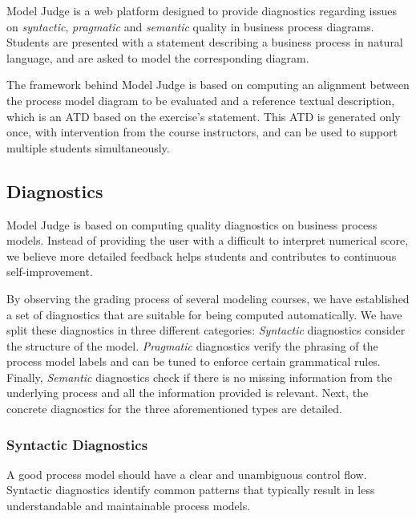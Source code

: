 Model Judge is a web platform designed to provide diagnostics regarding
issues on \emph{syntactic}, \emph{pragmatic} and \emph{semantic} quality in
business process diagrams. Students are presented with a statement describing a
business process in natural language, and are asked to model the corresponding
diagram.

The framework behind Model Judge is based on computing an alignment
between the process model diagram to be evaluated and a reference textual
description, which is an ATD based on the exercise's statement. This ATD is
generated only once, with intervention from the course instructors, and can be
used to support multiple students simultaneously.


\subsection{Diagnostics}

Model Judge is based on computing quality diagnostics on business process
models. Instead of providing the user with a difficult to interpret numerical
score, we believe more detailed feedback helps students and contributes to
continuous self-improvement.

By observing the grading process of several modeling courses, we have
established a set of diagnostics that are suitable for being computed
automatically. We have split these diagnostics in three different categories:
\emph{Syntactic} diagnostics consider the structure of the model.
\emph{Pragmatic} diagnostics verify the phrasing of the process model labels and
can be tuned to enforce certain grammatical rules. Finally, \emph{Semantic}
diagnostics check if there is no missing information from the underlying process
and all the information provided is relevant. Next, the concrete
diagnostics for the three aforementioned types are detailed.

\subsubsection{Syntactic Diagnostics}

A good process model should have a clear and unambiguous control flow.
Syntactic diagnostics identify common patterns that typically result in
less understandable and maintainable process models.


